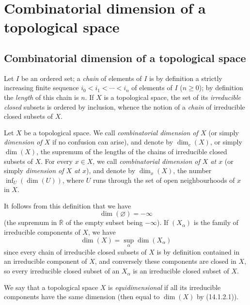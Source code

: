 \setcounter{section}{13}
\section{Combinatorial dimension of a topological space}
\label{section:0.14}

\setcounter{subsection}{0}
\subsection{Combinatorial dimension of a topological space}
\label{subsection:0.14.1}

\begin{env}[14.1.1]
\label{0.14.1.1}
Let $I$ be an ordered set; a \emph{chain} of elements of $I$ is by
definition a strictly increasing finite sequence
$i_0<i_1<\cdots<i_n$ of elements of $I$ ($n\geq 0$); by definition the
\emph{length} of this chain is $n$. If $X$ is a topological space,
the set of its \emph{irreducible closed} subsets is ordered by
inclusion, whence the notion of a \emph{chain} of irreducible closed subsets of
$X$.
\end{env}

\begin{definition}[14.1.2]
\label{0.14.1.2}
Let $X$ be a topological space. We call \emph{combinatorial dimension of
$X$} (or simply \emph{dimension of $X$} if no confusion can
arise), and denote by $\dim_c(X)$, or simply $\dim(X)$, the
supremum of the lengths of the chains of irreducible closed subsets of $X$.
For every $x\in X$, we call \emph{combinatorial dimension of $X$ at $x$}
(or simply \emph{dimension of $X$ at $x$}), and denote by $\dim_x(X)$, the
number $\inf_U(\dim(U))$, where $U$ runs through the set of open neighbourhoods of
$x$ in $X$.
\end{definition}

It follows from this definition that we have
\[
  \dim(\varnothing)=-\infty
\]
(the supremum in $\overline{\mathbb R}$ of the empty subset being
$-\infty$). If $(X_\alpha)$ is the family of irreducible components of
$X$, we have
\[
  \dim(X)=\sup_\alpha\dim(X_\alpha)
  \tag{14.1.2.1}\label{0.14.1.2.1}
\]
since every chain of irreducible closed subsets of $X$ is by definition
contained in an irreducible component of $X$, and conversely these
components are closed in $X$, so every irreducible closed subset of an
$X_\alpha$ is an irreducible closed subset of $X$.

\begin{definition}[14.1.3]
\label{0.14.1.3}
We say that a topological space $X$ is \emph{equidimensional} if all its
irreducible components have the same dimension (then equal to $\dim(X)$ by
(14.1.2.1)).
\end{definition}

